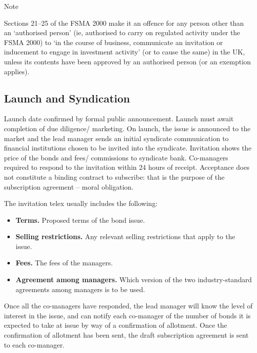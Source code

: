 \documentclass[
]{article}
\providecommand{\tightlist}{%
  \setlength{\itemsep}{0pt}\setlength{\parskip}{0pt}}
\newenvironment{env-9f1ad080-32f6-4f2b-8995-b682d7bd2848}
{
    \savenotes\tcolorbox[blanker,breakable,left=5pt,borderline west={2pt}{-4pt}{blue}]
}
{
    \endtcolorbox\spewnotes
}
\begin{document}
\begin{env-9f1ad080-32f6-4f2b-8995-b682d7bd2848}

Note

Sections 21--25 of the FSMA 2000 make it an offence for any person other
than an `authorised person' (ie, authorised to carry on regulated
activity under the FSMA 2000) to `in the course of business, communicate
an invitation or inducement to engage in investment activity' (or to
cause the same) in the UK, unless its contents have been approved by an
authorised person (or an exemption applies).

\end{env-9f1ad080-32f6-4f2b-8995-b682d7bd2848}

\hypertarget{launch-and-syndication}{%
\subsection{Launch and Syndication}\label{launch-and-syndication}}

Launch date confirmed by formal public announcement. Launch must await
completion of due diligence/ marketing. On launch, the issue is
announced to the market and the lead manager sends an initial syndicate
communication to financial institutions chosen to be invited into the
syndicate. Invitation shows the price of the bonds and fees/ commissions
to syndicate bank. Co-managers required to respond to the invitation
within 24 hours of receipt. Acceptance does not constitute a binding
contract to subscribe: that is the purpose of the subscription agreement
-- moral obligation.

The invitation telex usually includes the following:

\begin{itemize}
\tightlist
\item
  \textbf{Terms.} Proposed terms of the bond issue.
\item
  \textbf{Selling restrictions.} Any relevant selling restrictions that
  apply to the issue.
\item
  \textbf{Fees.} The fees of the managers.
\item
  \textbf{Agreement among managers.} Which version of the two
  industry-standard agreements among managers is to be used.
\end{itemize}

Once all the co-managers have responded, the lead manager will know the
level of interest in the issue, and can notify each co-manager of the
number of bonds it is expected to take at issue by way of a confirmation
of allotment. Once the confirmation of allotment has been sent, the
draft subscription agreement is sent to each co-manager.
\end{document}
